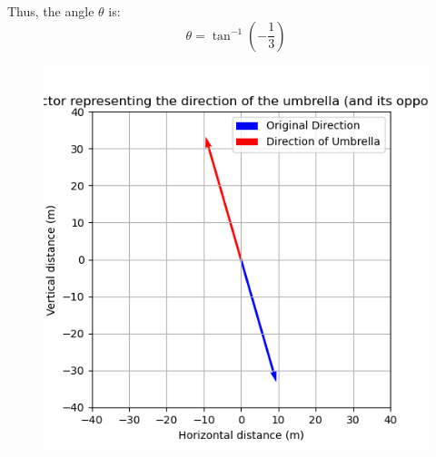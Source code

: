 \documentclass[journal]{IEEEtran}
\begin{document}
Thus, the angle \( \theta \) is:
\[
\theta = \tan^{-1}(-\frac{1}{3})
\]
    \begin{figure}[h]
        \centering
       \includegraphics[width=\linewidth]{figs/fig1.png}
       \caption{}
       \label{graph}
    \end{figure}
\end{document}
